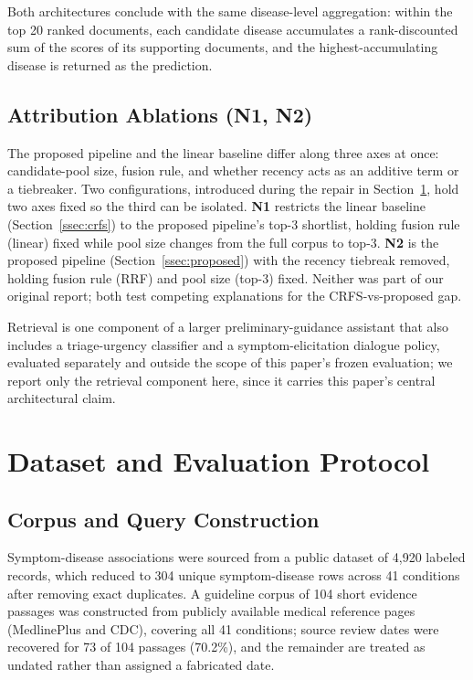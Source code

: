 \documentclass[10pt,conference]{IEEEtran}
\begin{document}
Both architectures conclude with the same disease-level aggregation: within the top 20 ranked documents, each candidate disease accumulates a rank-discounted sum of the scores of its supporting documents, and the highest-accumulating disease is returned as the prediction.

\subsection{Attribution Ablations (N1, N2)}
\label{ssec:attribution}

The proposed pipeline and the linear baseline differ along three axes at once: candidate-pool size, fusion rule, and whether recency acts as an additive term or a tiebreaker. Two configurations, introduced during the repair in Section~\ref{sec:dataset}, hold two axes fixed so the third can be isolated. \textbf{N1} restricts the linear baseline (Section~\ref{ssec:crfs}) to the proposed pipeline's top-3 shortlist, holding fusion rule (linear) fixed while pool size changes from the full corpus to top-3. \textbf{N2} is the proposed pipeline (Section~\ref{ssec:proposed}) with the recency tiebreak removed, holding fusion rule (RRF) and pool size (top-3) fixed. Neither was part of our original report; both test competing explanations for the CRFS-vs-proposed gap.

Retrieval is one component of a larger preliminary-guidance assistant that also includes a triage-urgency classifier and a symptom-elicitation dialogue policy, evaluated separately and outside the scope of this paper's frozen evaluation; we report only the retrieval component here, since it carries this paper's central architectural claim.

\section{Dataset and Evaluation Protocol}
\label{sec:dataset}

\subsection{Corpus and Query Construction}

Symptom-disease associations were sourced from a public dataset of 4{,}920 labeled records, which reduced to 304 unique symptom-disease rows across 41 conditions after removing exact duplicates. A guideline corpus of 104 short evidence passages was constructed from publicly available medical reference pages (MedlinePlus and CDC), covering all 41 conditions; source review dates were recovered for 73 of 104 passages (70.2\%), and the remainder are treated as undated rather than assigned a fabricated date.
\end{document}
